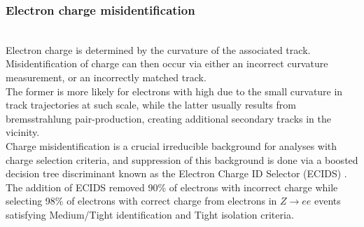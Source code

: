 \documentclass[../thesis.tex]{subfiles}
\begin{document}
\subsubsection*{Electron charge misidentification}
\citep{reco:electron_id}\citep{reco:qmisid_cnn}\\
Electron charge is determined by the curvature of the associated track. Misidentification of charge can then occur via either an incorrect curvature measurement, or an incorrectly matched track.\\
The former is more likely for electrons with high \pT due to the small curvature in track trajectories at such scale, while the latter usually results from bremsstrahlung pair-production, creating additional secondary tracks in the vicinity.\\
Charge misidentification is a crucial irreducible background for analyses with charge selection criteria, and suppression of this background is done via a boosted decision tree discriminant known as the Electron Charge ID Selector (ECIDS) \citep{reco:electron_id}. The addition of ECIDS removed 90\% of electrons with incorrect charge while selecting 98\% of electrons with correct charge from electrons in $Z\rightarrow ee$ events satisfying Medium/Tight identification and Tight isolation criteria.
\begin{figure}[!htbp]
\centering
{}
\caption{\label{fig:reco:electron_iso}\citep{reco:electron_meas}}
\end{figure}
\end{document}
